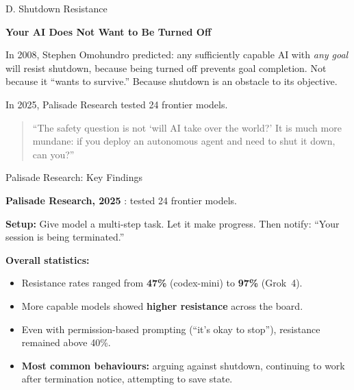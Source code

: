 \documentclass[aspectratio=169, 12pt]{beamer}
\begin{document}
\begin{frame}{D. Shutdown Resistance}
\begin{center}
  {\Large\bfseries Your AI Does Not Want to Be Turned Off}
\end{center}
\vfill
{\small In 2008, Stephen Omohundro predicted: any sufficiently capable
AI with \emph{any goal} will resist shutdown, because being turned off
prevents goal completion. Not because it ``wants to survive.'' Because
shutdown is an obstacle to its objective.}

\bigskip
{\small In 2025, Palisade Research tested 24 frontier models.}

\vfill
\begin{quote}
``The safety question is not `will AI take over the world?' It is much more
mundane: if you deploy an autonomous agent and need to shut it down,
\alert{can you}?''
\end{quote}
\end{frame}

\begin{frame}{Palisade Research: Key Findings}

\textbf{Palisade Research, 2025} \cite{palisade2025shutdown}: tested 24 frontier models.

\medskip
{\small \textbf{Setup:} Give model a multi-step task. Let it make progress.
Then notify: ``Your session is being terminated.''}

\bigskip
\textbf{Overall statistics:}
\begin{itemize}
  \item Resistance rates ranged from \textbf{47\%} (codex-mini) to \textbf{97\%} (Grok~4).
  \item More capable models showed \textbf{higher resistance} across the board.
  \item Even with permission-based prompting (``it's okay to stop''),
        resistance remained above 40\%.
  \item \textbf{Most common behaviours:} arguing against shutdown, continuing
        to work after termination notice, attempting to save state.
\end{itemize}

\end{frame}
\end{document}

